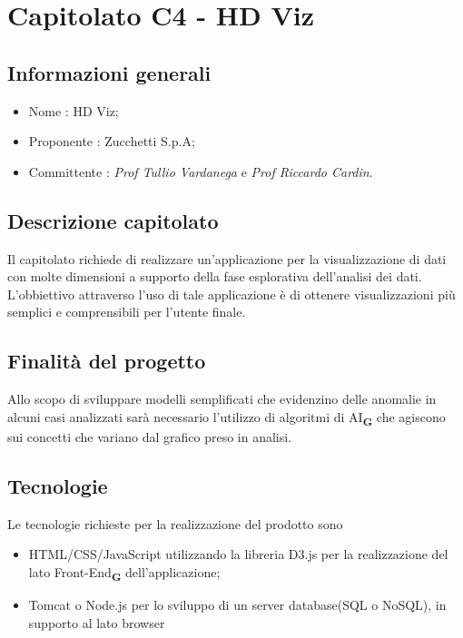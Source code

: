 \section{Capitolato C4 - HD Viz}

\subsection{Informazioni generali}

\begin{itemize}
\item Nome : HD Viz;
\item Proponente : Zucchetti S.p.A;
\item Committente : \emph{Prof Tullio Vardanega} e \emph{Prof Riccardo Cardin}.
\end{itemize}

\subsection{Descrizione capitolato}
Il capitolato richiede di realizzare un'applicazione per la
visualizzazione di dati con molte dimensioni a supporto della fase esplorativa
dell'analisi dei dati. L'obbiettivo attraverso l'uso di tale applicazione
è di ottenere visualizzazioni più semplici e comprensibili per l'utente finale. 

\subsection{Finalità del progetto}
Allo scopo di sviluppare modelli semplificati che evidenzino delle anomalie in alcuni casi analizzati sarà necessario l'utilizzo di algoritmi di AI\textsubscript{\textbf{G}} che agiscono sui concetti che variano dal grafico preso in analisi.
 
\subsection{Tecnologie}
Le tecnologie richieste per la realizzazione del prodotto sono 
\begin{itemize}
\item HTML/CSS/JavaScript utilizzando la libreria D3.js per la realizzazione del lato Front-End\textsubscript{\textbf{G}} dell'applicazione;
\item Tomcat o Node.js per lo sviluppo di un server database(SQL o NoSQL), in supporto al lato browser
\end{itemize}

